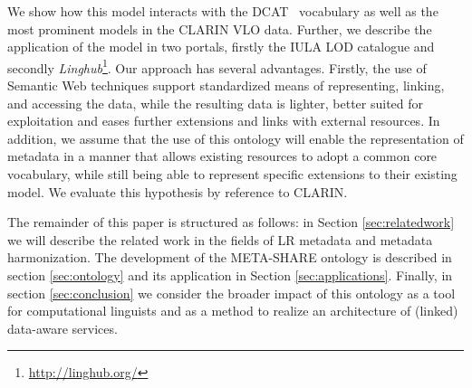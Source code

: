 \documentclass{llncs}
\begin{document}
We show how this model interacts with the DCAT~\cite{maali2014data} vocabulary
as well as the most prominent models in the CLARIN VLO data.
Further, we describe the application of the model in two portals, firstly the
IULA LOD catalogue and secondly
\emph{Linghub}\footnote{\url{http://linghub.org/}}.
Our approach has several advantages. Firstly, the use of Semantic Web techniques support standardized means of representing, linking, and accessing the data, while 
the resulting data is lighter, better suited for exploitation and eases further
extensions and links with external resources.
In addition, we assume that the use of this ontology will enable the representation of metadata in a manner that allows existing resources to adopt a
common core vocabulary, while still being able to represent specific extensions
to their existing model. We evaluate this hypothesis by reference to 
CLARIN.

The remainder of this paper is structured as follows: in Section
\ref{sec:relatedwork} we will describe the related work in the fields of
LR metadata and metadata harmonization. The development of the
META-SHARE ontology is described in section \ref{sec:ontology}
and its application in Section \ref{sec:applications}.
Finally, in section \ref{sec:conclusion} we consider the broader
impact of this ontology as a tool for computational linguists and as a method to
realize an architecture of (linked) data-aware services.
\end{document}
